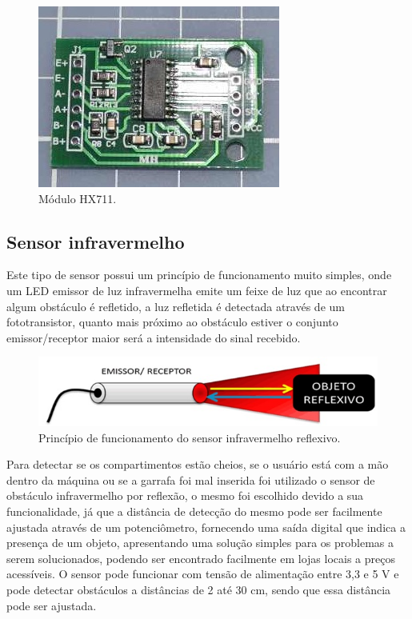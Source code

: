 \begin{figure}[!ht]
	\centering
		\includegraphics[scale=0.6]{figuras/eletronica/16-Modulo-HX711.jpg}
	\caption{Módulo HX711.}
\end{figure}

\subsection{Sensor infravermelho}
Este tipo de sensor possui um princípio de funcionamento muito simples, onde um LED emissor de luz infravermelha emite um feixe de luz que ao encontrar algum obstáculo é refletido, a luz refletida é detectada através de um fototransistor, quanto mais próximo ao obstáculo estiver o conjunto emissor/receptor maior será a intensidade do sinal recebido. \cite{sensoresOpticos}

\begin{figure}[!ht]
	\centering
		\includegraphics[scale=0.7]{figuras/eletronica/17-Principio-de-funcionamento-do-sensor-infravermelho-reflexivo.jpg}
	\caption{Princípio de funcionamento do sensor infravermelho reflexivo.}
\end{figure}

Para detectar se os compartimentos estão cheios, se o usuário está com a mão dentro da máquina ou se a garrafa foi mal inserida foi utilizado o sensor de obstáculo infravermelho por reflexão, o mesmo foi escolhido devido a sua funcionalidade, já que a distância de detecção do mesmo pode ser facilmente ajustada através de um potenciômetro, fornecendo uma saída digital que indica a presença de um objeto, apresentando uma solução simples para os problemas a serem solucionados, podendo ser encontrado facilmente em lojas locais a preços acessíveis. O sensor pode funcionar com tensão de alimentação entre 3,3 e 5 V e pode detectar obstáculos a distâncias de 2 até 30 cm, sendo que essa distância pode ser ajustada. \cite{sensorReflexivo}


